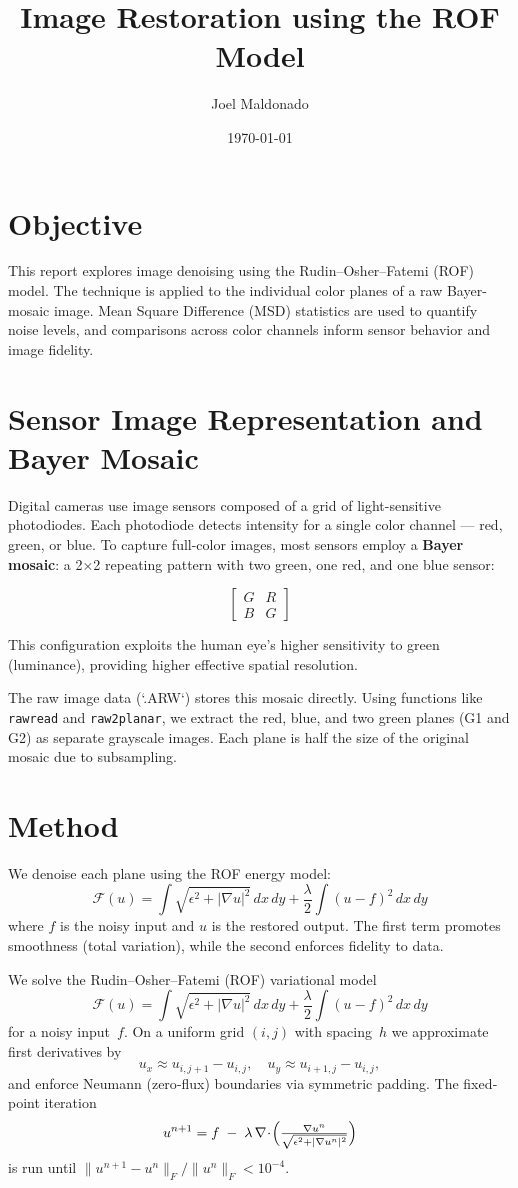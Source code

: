 \documentclass[11pt]{article}
\title{Image Restoration using the ROF Model}
\author{Joel Maldonado}
\date{\today}
\begin{document}
\maketitle

\section*{Objective}
This report explores image denoising using the Rudin–Osher–Fatemi (ROF) model. The technique is applied to the individual color planes of a raw Bayer-mosaic image. Mean Square Difference (MSD) statistics are used to quantify noise levels, and comparisons across color channels inform sensor behavior and image fidelity.

\section*{Sensor Image Representation and Bayer Mosaic}
Digital cameras use image sensors composed of a grid of light-sensitive photodiodes. Each photodiode detects intensity for a single color channel — red, green, or blue. To capture full-color images, most sensors employ a \textbf{Bayer mosaic}: a 2×2 repeating pattern with two green, one red, and one blue sensor:

\[
\begin{bmatrix}
G & R \\
B & G
\end{bmatrix}
\]

This configuration exploits the human eye's higher sensitivity to green (luminance), providing higher effective spatial resolution.

The raw image data (`.ARW`) stores this mosaic directly. Using functions like \texttt{rawread} and \texttt{raw2planar}, we extract the red, blue, and two green planes (G1 and G2) as separate grayscale images. Each plane is half the size of the original mosaic due to subsampling.

\section*{Method}
We denoise each plane using the ROF energy model:
\[
\mathcal{F}(u) = \int \sqrt{\epsilon^2 + |\nabla u|^2} \, dx\,dy + \frac{\lambda}{2} \int (u - f)^2 \, dx\,dy
\]
where \( f \) is the noisy input and \( u \) is the restored output. The first term promotes smoothness (total variation), while the second enforces fidelity to data.


We solve the Rudin–Osher–Fatemi (ROF) variational model
\[
\mathcal{F}(u)
=\int \sqrt{\epsilon^2 + |\nabla u|^2}\,dx\,dy
+\frac{\lambda}{2}\int (u - f)^2\,dx\,dy
\]
for a noisy input~$f$.  On a uniform grid $(i,j)$ with spacing~$h$ we 
approximate first derivatives by
\[
u_x\approx u_{i,j+1}-u_{i,j},\quad
u_y\approx u_{i+1,j}-u_{i,j},
\]
and enforce Neumann (zero‐flux) boundaries via symmetric padding.  
The fixed‐point iteration
\[
u^{n+1}
= f \;-\;\lambda\,\nabla\!\cdot\!\Bigl(\tfrac{\nabla u^n}{\sqrt{\epsilon^2 + |\nabla u^n|^2}}\Bigr)
\]
is run until 
$\|u^{n+1}-u^n\|_F/\|u^n\|_F<10^{-4}$.
\end{document}

